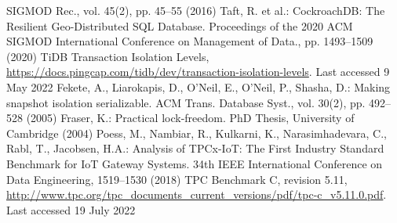 \begin{thebibliography}{8}
{SIGMOD} Rec., vol. 45(2), pp. 45--55 (2016)
%
%
Taft, R. et al.:
CockroachDB: The Resilient Geo-Distributed SQL Database.
Proceedings of the 2020 ACM SIGMOD International Conference on Management of Data., 
pp. 1493--1509 (2020)
%
%
TiDB Transaction Isolation Levels, 
\url{https://docs.pingcap.com/tidb/dev/transaction-isolation-levels}. 
Last accessed 9 May 2022
%
Fekete, A., Liarokapis, D., O'Neil, E., O'Neil, P., Shasha, D.:
Making snapshot isolation serializable.
{ACM} Trans. Database Syst.,
vol. 30(2),
pp. 492--528
(2005)
%
Fraser, K.: Practical lock-freedom. PhD Thesis, University of Cambridge (2004)
% 
Poess, M., Nambiar, R., Kulkarni, K., Narasimhadevara, C., Rabl, T., Jacobsen, H.A.:
Analysis of TPCx-IoT: The First Industry Standard Benchmark for IoT Gateway Systems. 34th {IEEE} International Conference on Data Engineering, 1519--1530 (2018) 
%
{TPC Benchmark C}, revision 5.11, 
\url{http://www.tpc.org/tpc_documents_current_versions/pdf/tpc-c_v5.11.0.pdf}. 
Last accessed 19 July 2022
%
%
%
%
\end{thebibliography}